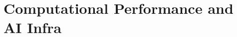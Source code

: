 \setcounter{chapter}{6}

\hypertarget{computational-performance-and-ai-infra}{%
\chapter{Computational Performance and AI Infra}\label{computational-performance-and-ai-infra}}
